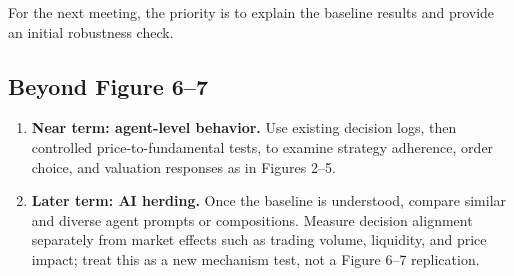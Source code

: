 For the next meeting, the priority is to explain the baseline results
and provide an initial robustness check.

\subsection*{Beyond Figure 6--7}

\begin{enumerate}
\item \textbf{Near term: agent-level behavior.} Use existing decision
logs, then controlled price-to-fundamental tests, to examine strategy
adherence, order choice, and valuation responses as in Figures 2--5.

\item \textbf{Later term: AI herding.} Once the baseline is understood,
compare similar and diverse agent prompts or compositions. Measure
decision alignment separately from market effects such as trading
volume, liquidity, and price impact; treat this as a new mechanism
test, not a Figure 6--7 replication.
\end{enumerate}
